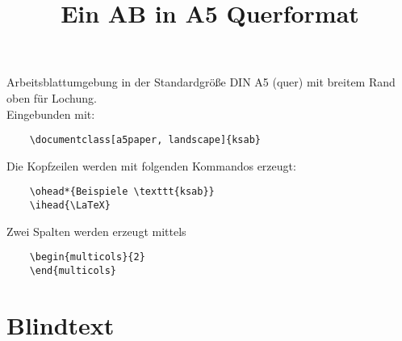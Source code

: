 \documentclass[a5paper, landscape]{ksab}
\title{Ein AB in A5 Querformat}
\begin{document}
  \maketitle
  
  \begin{multicols}{2}

  Arbeitsblattumgebung in der Standardgröße DIN A5 (quer) mit breitem Rand oben für Lochung.\\
  Eingebunden mit:
  \begin{verbatim}
    \documentclass[a5paper, landscape]{ksab}
  \end{verbatim}
  
  Die Kopfzeilen werden mit folgenden Kommandos erzeugt:
  \begin{verbatim}
    \ohead*{Beispiele \texttt{ksab}}
    \ihead{\LaTeX}
  \end{verbatim}
  
  Zwei Spalten werden erzeugt mittels
  \begin{verbatim}
    \begin{multicols}{2}
    \end{multicols}
  \end{verbatim}
  
  
  \section{Blindtext}

    \blindtext[1]
  \end{multicols}
\end{document}

